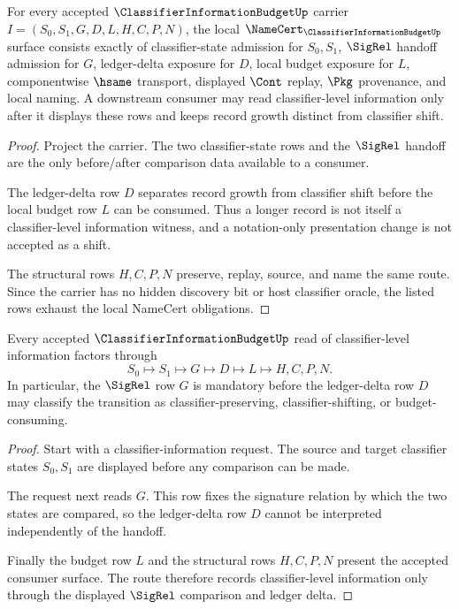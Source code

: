 \begin{theorem}
\label{thm:classifier-information-budget-namecert-obligations}
For every accepted $\ClassifierInformationBudgetUp$ carrier $I=(S_0,S_1,G,D,L,H,C,P,N)$, the local $\NameCert_{\ClassifierInformationBudgetUp}$ surface consists exactly of classifier-state admission for $S_0,S_1$, $\SigRel$ handoff admission for $G$, ledger-delta exposure for $D$, local budget exposure for $L$, componentwise $\hsame$ transport, displayed $\Cont$ replay, $\Pkg$ provenance, and local naming. A downstream consumer may read classifier-level information only after it displays these rows and keeps record growth distinct from classifier shift.
\end{theorem}
\begin{proof}
Project the carrier. The two classifier-state rows and the $\SigRel$ handoff are the only before/after comparison data available to a consumer.

The ledger-delta row $D$ separates record growth from classifier shift before the local budget row $L$ can be consumed. Thus a longer record is not itself a classifier-level information witness, and a notation-only presentation change is not accepted as a shift.

The structural rows $H,C,P,N$ preserve, replay, source, and name the same route. Since the carrier has no hidden discovery bit or host classifier oracle, the listed rows exhaust the local NameCert obligations.
\end{proof}

\begin{theorem}
\label{thm:classifier-information-budget-sigrel-handoff}
Every accepted $\ClassifierInformationBudgetUp$ read of classifier-level information factors through
$$
S_0\longmapsto S_1\longmapsto G\longmapsto D\longmapsto L\longmapsto H,C,P,N.
$$
In particular, the $\SigRel$ row $G$ is mandatory before the ledger-delta row $D$ may classify the transition as classifier-preserving, classifier-shifting, or budget-consuming.
\end{theorem}
\begin{proof}
Start with a classifier-information request. The source and target classifier states $S_0,S_1$ are displayed before any comparison can be made.

The request next reads $G$. This row fixes the signature relation by which the two states are compared, so the ledger-delta row $D$ cannot be interpreted independently of the handoff.

Finally the budget row $L$ and the structural rows $H,C,P,N$ present the accepted consumer surface. The route therefore records classifier-level information only through the displayed $\SigRel$ comparison and ledger delta.
\end{proof}

